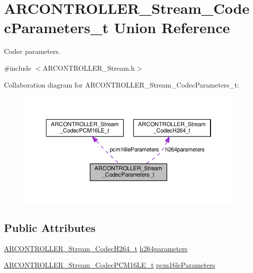 \hypertarget{union_a_r_c_o_n_t_r_o_l_l_e_r___stream___codec_parameters__t}{}\section{A\+R\+C\+O\+N\+T\+R\+O\+L\+L\+E\+R\+\_\+\+Stream\+\_\+\+Codec\+Parameters\+\_\+t Union Reference}
\label{union_a_r_c_o_n_t_r_o_l_l_e_r___stream___codec_parameters__t}


Codec parameters.  




{\ttfamily \#include $<$A\+R\+C\+O\+N\+T\+R\+O\+L\+L\+E\+R\+\_\+\+Stream.\+h$>$}



Collaboration diagram for A\+R\+C\+O\+N\+T\+R\+O\+L\+L\+E\+R\+\_\+\+Stream\+\_\+\+Codec\+Parameters\+\_\+t\+:
\nopagebreak
\begin{figure}[H]
\begin{center}
\leavevmode
\includegraphics[width=350pt]{union_a_r_c_o_n_t_r_o_l_l_e_r___stream___codec_parameters__t__coll__graph}
\end{center}
\end{figure}
\subsection*{Public Attributes}
\begin{DoxyCompactItemize}
\item 
\hyperlink{struct_a_r_c_o_n_t_r_o_l_l_e_r___stream___codec_h264__t}{A\+R\+C\+O\+N\+T\+R\+O\+L\+L\+E\+R\+\_\+\+Stream\+\_\+\+Codec\+H264\+\_\+t} \hyperlink{union_a_r_c_o_n_t_r_o_l_l_e_r___stream___codec_parameters__t_a4c16d6914cc5254f9df1f7ecc1453977}{h264parameters}
\item 
\hyperlink{struct_a_r_c_o_n_t_r_o_l_l_e_r___stream___codec_p_c_m16_l_e__t}{A\+R\+C\+O\+N\+T\+R\+O\+L\+L\+E\+R\+\_\+\+Stream\+\_\+\+Codec\+P\+C\+M16\+L\+E\+\_\+t} \hyperlink{union_a_r_c_o_n_t_r_o_l_l_e_r___stream___codec_parameters__t_ac2b040fba389b4e63f6f71d101557b81}{pcm16le\+Parameters}
\end{DoxyCompactItemize}


